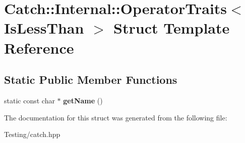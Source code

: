 \hypertarget{struct_catch_1_1_internal_1_1_operator_traits_3_01_is_less_than_01_4}{\section{Catch\-:\-:Internal\-:\-:Operator\-Traits$<$ Is\-Less\-Than $>$ Struct Template Reference}
\label{struct_catch_1_1_internal_1_1_operator_traits_3_01_is_less_than_01_4}
}
\subsection*{Static Public Member Functions}
\begin{DoxyCompactItemize}
\item 
\hypertarget{struct_catch_1_1_internal_1_1_operator_traits_3_01_is_less_than_01_4_aa3b536ddbd2e34b1253931ff00c32712}{static const char $\ast$ {\bfseries get\-Name} ()}\label{struct_catch_1_1_internal_1_1_operator_traits_3_01_is_less_than_01_4_aa3b536ddbd2e34b1253931ff00c32712}

\end{DoxyCompactItemize}


The documentation for this struct was generated from the following file\-:\begin{DoxyCompactItemize}
\item 
Testing/catch.\-hpp\end{DoxyCompactItemize}
